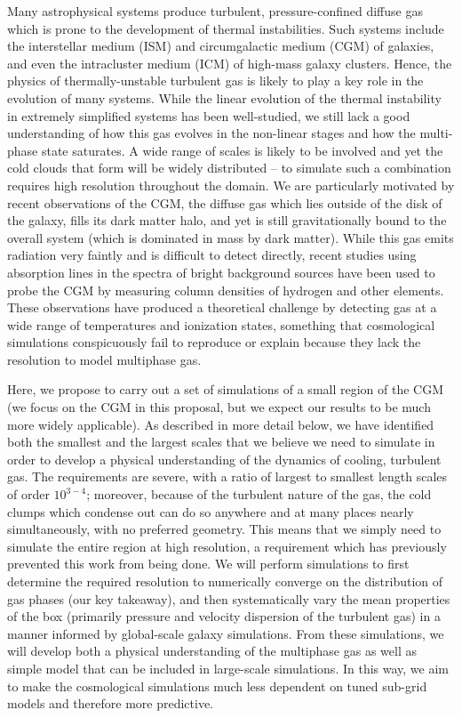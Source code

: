 \documentclass[11pt,letterpaper,english]{article}
\begin{document}
Many astrophysical systems produce turbulent, pressure-confined diffuse gas which is prone to the development of thermal instabilities. Such systems include the interstellar medium (ISM) and circumgalactic medium (CGM) of galaxies, and even the intracluster medium (ICM) of high-mass galaxy clusters. Hence, the physics of thermally-unstable turbulent gas is likely to play a key role in the evolution of many systems. While the linear evolution of the thermal instability in extremely simplified systems has been well-studied, we still lack a good understanding of how this gas evolves in the non-linear stages and how the multi-phase state saturates. A wide range of scales is likely to be involved and yet the cold clouds that form will be widely distributed -- to simulate such a combination requires high resolution throughout the domain. We are particularly motivated by recent observations of the CGM, the diffuse gas which lies outside of the disk of the galaxy, fills its dark matter halo, and yet is still gravitationally bound to the overall system (which is dominated in mass by dark matter). While this gas emits radiation very faintly and is difficult to detect directly, recent studies using absorption lines in the spectra of bright background sources have been used to probe the CGM by measuring column densities of hydrogen and other elements. These observations have produced a theoretical challenge by detecting gas at a wide range of temperatures and ionization states, something that cosmological simulations conspicuously fail to reproduce or explain because they lack the resolution to model multiphase gas.

Here, we propose to carry out a set of simulations of a small region of the CGM (we focus on the CGM in this proposal, but we expect our results to be much more widely applicable).  As described in more detail below, we have identified both the smallest and the largest scales that we believe we need to simulate in order to develop a physical understanding of the dynamics of cooling, turbulent gas.  The requirements are severe, with a ratio of largest to smallest length scales of order $10^{3-4}$; moreover, because of the turbulent nature of the gas, the cold clumps which condense out can do so anywhere and at many places nearly simultaneously, with no preferred geometry.  This means that we simply need to simulate the entire region at high resolution, a requirement which has previously prevented this work from being done.  We will perform simulations to first determine the required resolution to numerically converge on the distribution of gas phases (our key takeaway), and then systematically vary the mean properties of the box (primarily pressure and velocity dispersion of the turbulent gas) in a manner informed by global-scale galaxy simulations. From these simulations, we will develop both a physical understanding of the multiphase gas as well as simple model that can be included in large-scale simulations.  In this way, we aim to make the cosmological simulations much less dependent on tuned sub-grid models and therefore more predictive.
\end{document}
